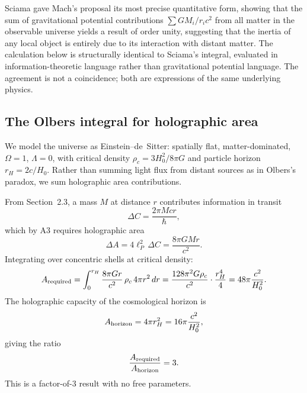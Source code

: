 \documentclass[12pt]{article}
\begin{document}
Sciama \cite{Sciama1953} gave Mach's proposal its most precise
quantitative form, showing that the sum of gravitational potential
contributions $\sum GM_i/r_i c^2$ from all matter in the observable
universe yields a result of order unity, suggesting that the inertia
of any local object is entirely due to its interaction with
distant matter.
The calculation below is structurally identical to Sciama's integral,
evaluated in information-theoretic language rather than gravitational
potential language.
The agreement is not a coincidence; both are expressions of the same
underlying physics.

\subsection*{The Olbers integral for holographic area}

We model the universe as Einstein--de~Sitter: spatially flat,
matter-dominated, $\Omega = 1$, $\Lambda = 0$, with critical density
$\rho_c = 3H_0^2/8\pi G$ and particle horizon $r_H = 2c/H_0$.
Rather than summing light flux from distant sources as in Olbers's
paradox, we sum holographic area contributions.

From Section~2.3, a mass $M$ at distance $r$ contributes information
in transit
\begin{equation}
  \Delta C = \frac{2\pi Mcr}{\hbar},
  \label{eq:app-transit}
\end{equation}
which by A3 requires holographic area
\begin{equation}
  \Delta A = 4\ell_P^2\,\Delta C = \frac{8\pi GMr}{c^2}.
  \label{eq:app-deltaA}
\end{equation}
Integrating over concentric shells at critical density:
\begin{equation}
  A_{\rm required}
  = \int_0^{r_H}\frac{8\pi Gr}{c^2}\,\rho_c\,4\pi r^2\,dr
  = \frac{128\pi^2 G\rho_c}{c^2}\cdot\frac{r_H^4}{4}
  = 48\pi\frac{c^2}{H_0^2}.
  \label{eq:app-required}
\end{equation}
The holographic capacity of the cosmological horizon is
\begin{equation}
  A_{\rm horizon} = 4\pi r_H^2 = 16\pi\frac{c^2}{H_0^2},
  \label{eq:app-horizon}
\end{equation}
giving the ratio
\begin{equation}
  \frac{A_{\rm required}}{A_{\rm horizon}} = 3.
  \label{eq:app-ratio}
\end{equation}
This is a factor-of-3 result with no free parameters.
\end{document}
